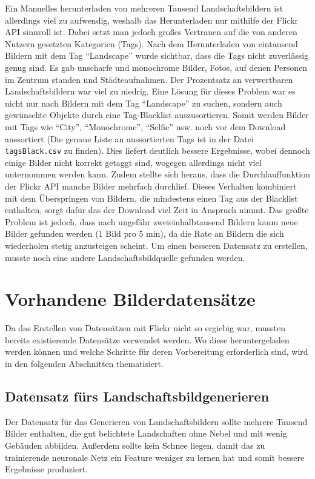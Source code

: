 Ein Manuelles herunterladen von mehreren Tausend Landschaftsbildern ist allerdings viel zu aufwendig, weshalb das Herunterladen nur mithilfe der Flickr API sinnvoll ist. Dabei setzt man jedoch großes Vertrauen auf die von anderen Nutzern gesetzten Kategorien (Tags). Nach dem Herunterladen von eintausend Bildern mit dem Tag \enquote{Landscape} wurde sichtbar, dass die Tags nicht zuverlässig genug sind. Es gab unscharfe und monochrome Bilder, Fotos, auf denen Personen im Zentrum standen und Städteaufnahmen. Der Prozentsatz an verwertbaren Landschaftsbildern war viel zu niedrig. Eine Lösung für dieses Problem war es nicht nur nach Bildern mit dem Tag  \enquote{Landscape} zu suchen, sondern auch gewünschte Objekte durch eine Tag-Blacklist auszusortieren. Somit werden Bilder mit Tags wie \enquote{City}, \enquote{Monochrome}, \enquote{Selfie} usw. noch vor dem Download aussortiert (Die genaue Liste an aussortierten Tags ist in der Datei \texttt{tagsBlack.csv} zu finden). Dies liefert deutlich bessere Ergebnisse, wobei dennoch einige Bilder nicht korrekt getaggt sind, wogegen allerdings nicht viel unternommen werden kann. Zudem stellte sich heraus, dass die Durchlauffunktion der Flickr API manche Bilder mehrfach durchlief. Dieses Verhalten kombiniert mit dem Überspringen von Bildern, die mindestens einen Tag aus der Blacklist enthalten, sorgt dafür das der Download viel Zeit in Anspruch nimmt. Das größte Problem ist jedoch, dass nach ungefähr zweieinhalbtausend Bildern kaum neue Bilder gefunden werden (1 Bild pro 5 min), da die Rate an Bildern die sich wiederholen stetig anzusteigen scheint. Um einen besseren Datensatz zu erstellen, musste noch eine andere Landschaftsbildquelle gefunden werden.

\section{Vorhandene Bilderdatensätze}%

Da das Erstellen von Datensätzen mit Flickr nicht so ergiebig war, mussten bereits existierende Datensätze verwendet werden. Wo diese heruntergeladen werden können und welche Schritte für deren Vorbereitung erforderlich sind, wird in den folgenden Abschnitten thematisiert. 

\subsection{Datensatz fürs Landschaftsbildgenerieren}

Der Datensatz für das Generieren von Landschaftsbildern sollte mehrere Tausend Bilder enthalten, die gut belichtete Landschaften ohne Nebel und mit wenig Gebäuden abbilden. Außerdem sollte kein Schnee liegen, damit das zu trainierende neuronale Netz ein Feature weniger zu lernen hat und somit bessere Ergebnisse produziert.

